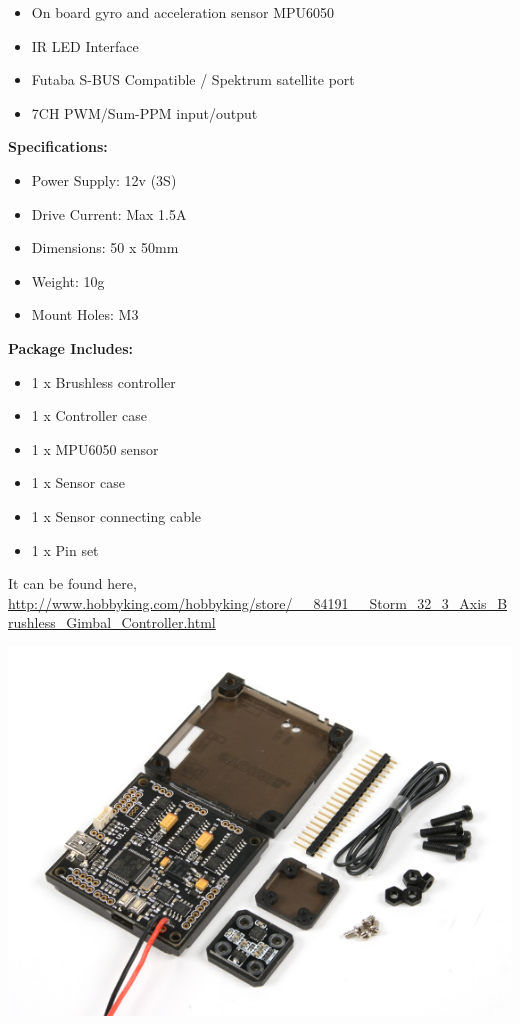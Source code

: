 \documentclass[11pt,a4paper]{article}
\begin{document}
\begin{enumerate}
\begin{itemize}
				\item On board gyro and acceleration sensor MPU6050
				\item IR LED Interface
				\item Futaba S-BUS Compatible / Spektrum satellite port
				\item 7CH PWM/Sum-PPM input/output
			\end{itemize}
			\textbf{Specifications:}
			\begin{itemize}
				\item Power Supply: 12v (3S)
				\item Drive Current: Max 1.5A
				\item Dimensions: 50 x 50mm
				\item Weight: 10g
				\item Mount Holes: M3
			\end{itemize}
			\textbf{Package Includes:}
			\begin{itemize}
				\item 1 x Brushless controller
				\item 1 x Controller case
				\item 1 x MPU6050 sensor
				\item 1 x Sensor case
				\item 1 x Sensor connecting cable
				\item 1 x Pin set
			\end{itemize}
			It can be found here,
			\newline
			\url{http://www.hobbyking.com/hobbyking/store/__84191__Storm_32_3_Axis_Brushless_Gimbal_Controller.html}
			\begin{center}
				\includegraphics[scale=0.3]{Controller.jpg}

\end{center}
\end{enumerate}
\end{document}
